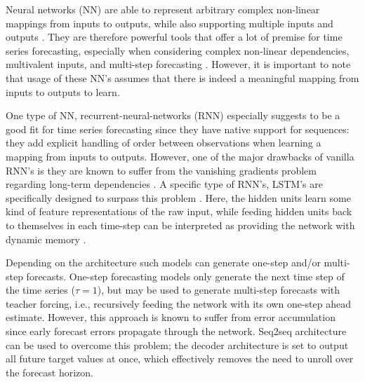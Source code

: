 \documentclass[format=sigconf, review=false, screen=true]{acmart}
\begin{document}
Neural networks (NN) are able to represent arbitrary complex non-linear mappings from inputs to outputs, while also supporting multiple inputs and outputs \citep{brownlee2018deep}. They are therefore powerful tools that offer a lot of premise for time series forecasting, especially when considering complex non-linear dependencies, multivalent inputs, and multi-step forecasting \citep{brownlee2018deep}. However, it is important to note that usage of these NN's assumes that there is indeed a meaningful mapping from inputs to outputs to learn. 

One type of NN, recurrent-neural-networks (RNN) especially suggests to be a good fit for time series forecasting since they have native support for sequences: they add explicit handling of order between observations when learning a mapping from inputs to outputs. However, one of the major drawbacks of vanilla RNN's is they are known to suffer from the vanishing gradients problem regarding long-term dependencies \citep{hochreiter1998vanishing}. A specific type of RNN's, LSTM's are specifically designed to surpass this problem \citep{hochreiter1997long}. Here, the hidden units learn some kind of feature representations of the raw input, while feeding hidden units back to themselves in each time-step can be interpreted as providing the network with dynamic memory \citep{benidis2020neural}.  

Depending on the architecture such models can generate one-step and/or multi-step forecasts. One-step forecasting models only generate the next time step of the time series ($\tau = 1$), but may be used to generate multi-step forecasts with teacher forcing, i.e., recursively feeding the network with its own one-step ahead estimate. However, this approach is known to suffer from error accumulation since early forecast errors propagate through the network. Seq2seq architecture can be used to overcome this problem; the decoder architecture is set to output all future target values at once, which effectively removes the need to unroll over the forecast horizon. 

\end{document}

